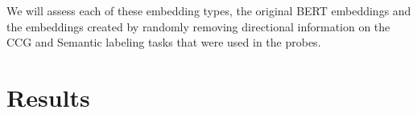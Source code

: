 \documentclass[11pt,a4paper]{article}
\begin{document}
We will assess each of these embedding types, the original BERT embeddings and the embeddings created by randomly removing directional information on the CCG and Semantic labeling tasks that were used in the probes. 





\section{Results}
\label{sec:result}
\end{document}

